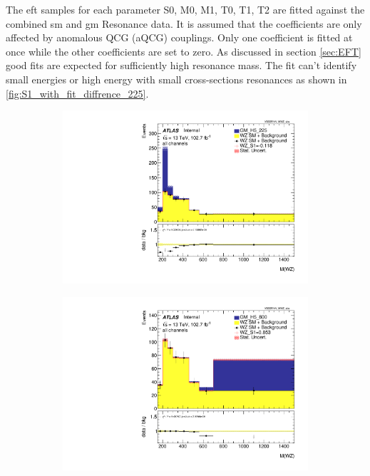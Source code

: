 \documentclass[../Bachelorarbeit.tex]{subfiles}
\begin{document}
\label{sec:results}
The \acrshort{eft} samples for each parameter S0, M0, M1, T0, T1, T2 are fitted against the combined \acrshort{sm} and \acrshort{gm} Resonance data. It is assumed that the coefficients are only affected by anomalous QCG (aQCG) couplings.
Only one coefficient is fitted at once while the other coefficients are set to zero. As discussed in section \ref{sec:EFT} good fits are expected for sufficiently high resonance mass.
The fit can't identify small energies or high energy with small cross-sections resonances as shown in \ref{fig:S1_with_fit_diffrence_225}.

\begin{figure}[h]
    \centering
    \begin{subfigure}{0.3\textwidth}
        \includegraphics[width=\textwidth]{Plots/ALL_MWZ_right_color/GM_H5_225/S1/2022-05-07/VBSSR/all_VV_MWZ_vbs.pdf}
        \caption{}
    \end{subfigure}
    \begin{subfigure}{0.3\textwidth}
        \includegraphics[width=\textwidth]{Plots/ALL_MWZ_right_color/GM_H5_800/S1/2022-05-07/VBSSR/all_VV_MWZ_vbs.pdf}

\end{subfigure}
\end{figure}
\end{document}
